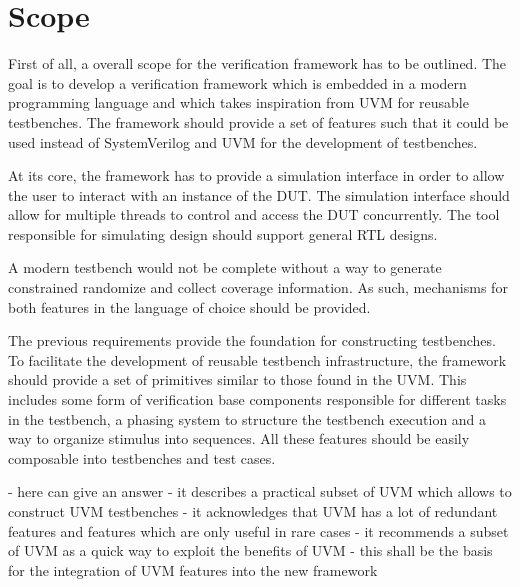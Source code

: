 \section{Scope} %

First of all, a overall scope for the verification framework has to be outlined. The goal is to develop a
verification framework which is embedded in a modern programming language and which takes inspiration from UVM for
reusable testbenches. The framework should provide a set of features such that it could be used instead of
SystemVerilog and UVM for the development of testbenches.

At its core, the framework has to provide a simulation interface in order to allow the user to interact with an
instance of the DUT. The simulation interface should allow for multiple threads to control and access the DUT
concurrently. The tool responsible for simulating design should support general RTL designs.

A modern testbench would not be complete without a way to generate constrained randomize and collect coverage
information. As such, mechanisms for both features in the language of choice should be provided. 

The previous requirements provide the foundation for constructing testbenches. To facilitate the development of
reusable testbench infrastructure, the framework should provide a set of primitives similar to those found in the
UVM. This includes some form of verification base components responsible for different tasks in the testbench, a
phasing system to structure the testbench execution and a way to organize stimulus into sequences. All these features
should be easily composable into testbenches and test cases.



- here \cite{sutherland2015uvm} can give an answer
- it describes a practical subset of UVM which allows to construct UVM testbenches
- it acknowledges that UVM has a lot of redundant features and features which are only useful in rare cases
- it recommends a subset of UVM as a quick way to exploit the benefits of UVM
- this shall be the basis for the integration of UVM features into the new framework

